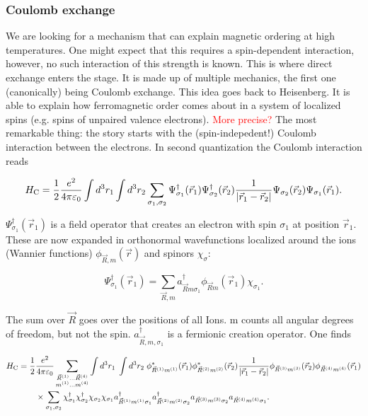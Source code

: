 \documentclass[../../main.tex]{subfiles}
\begin{document}
\subsubsection{Coulomb exchange}

We are looking for a mechanism that can explain magnetic ordering at high temperatures. One might expect that this requires a spin-dependent interaction, however, no such interaction of this strength is known. This is where direct exchange enters the stage. It is made up of multiple mechanics, the first one (canonically) being Coulomb exchange. This idea goes back to Heisenberg. It is able to explain how ferromagnetic order comes about in a system of localized spins (e.g. spins of unpaired valence electrons). \textcolor{red}{ More precise? } The most remarkable thing: the story starts with the (spin-indepedent!) Coulomb interaction between the electrons. In second quantization the Coulomb interaction reads

\begin{equation}
H_{\text{C}} = \frac12 \frac{e^2}{4 \pi \varepsilon_0} \int  d^3r_1 \int  d^3r_2 \sum_{\sigma_1, \sigma_2} \Psi_{\sigma_1}^\dagger(\vec{r}_1) \Psi_{\sigma_2}^\dagger(\vec{r}_2) \frac{1}{\abs{\vec{r}_1-\vec{r}_2}} \Psi_{\sigma_2}(\vec{r}_2) \Psi_{\sigma_1}(\vec{r}_1).
\end{equation}

$\Psi_{\sigma_1}^\dagger(\vec{r}_1)$ is a field operator that creates an electron with spin $\sigma_1$ at position $\vec{r}_1$. These are now expanded in orthonormal wavefunctions localized around the ions (Wannier functions) $\phi_{\vec{R},m}(\vec{r})$ and spinors $\chi_\sigma$:

\begin{equation}
	\Psi_{\sigma_1}^\dagger(\vec{r}_1) = \sum_{\vec{R}, m} a^\dagger_{\vec{R} m \sigma_1} \phi_{\vec{R}m} (\vec{r}_1) \chi_{\sigma_1}. 
\end{equation}


The sum over $\vec{R}$ goes over the positions of all Ions. m counts all angular degrees of freedom, but not the spin. $a_{\vec{R}, m, \sigma_1}^\dagger$ is a fermionic creation operator. One finds

\begin{align}
	H_{\text{C}} = \frac12 &\frac{e^2}{4\pi \varepsilon_0}  \sum_{\substack{\vec{R}^{(1)} ... \vec{R}^{(4)} \\ m^{(1)} ... m^{(4)}}} \int d^3 r_1 \; \int d^3 r_2 \; \phi_{\vec{R}^{(1)} m^{(1)}}^* (\vec{r}_1) \phi_{\vec{R}^{(2)} m^{(2)}}^* (\vec{r}_2) \frac{1}{\abs{\vec{r}_1-\vec{r}_2}} \phi_{\vec{R}^{(3)} m^{(3)}}(\vec{r}_2) \phi_{\vec{R}^{(4)} m^{(4)}}(\vec{r}_1) \notag \\
	& \times \sum_{\sigma_1, \sigma_2} \chi_{\sigma_1}^\dagger \chi_{\sigma_2}^\dagger \chi_{\sigma_2} \chi_{\sigma_1} a_{\vec{R}^{(1)} m^{(1)} \sigma_1}^\dagger a_{\vec{R}^{(2)} m^{(2)} \sigma_2}^\dagger a_{\vec{R}^{(3)} m^{(3)} \sigma_2} a_{\vec{R}^{(4)} m^{(4)} \sigma_1}. 
\end{align}
\end{document}
